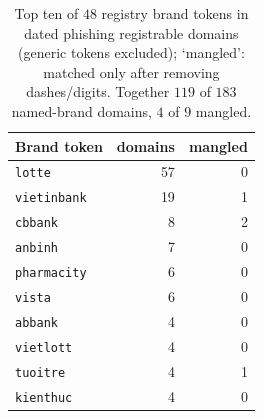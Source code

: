 \begin{table}[t]\centering
\caption{Top ten of $48$ registry brand tokens in dated phishing registrable domains (generic tokens excluded); `mangled': matched only after removing dashes/digits. Together $119$ of $183$ named-brand domains, $4$ of $9$ mangled.}
\label{tab:brands}
\begin{tabular}{lrr}\toprule
Brand token & domains & mangled \\ \midrule
\texttt{lotte} & 57 & 0 \\
\texttt{vietinbank} & 19 & 1 \\
\texttt{cbbank} & 8 & 2 \\
\texttt{anbinh} & 7 & 0 \\
\texttt{pharmacity} & 6 & 0 \\
\texttt{vista} & 6 & 0 \\
\texttt{abbank} & 4 & 0 \\
\texttt{vietlott} & 4 & 0 \\
\texttt{tuoitre} & 4 & 1 \\
\texttt{kienthuc} & 4 & 0 \\
\bottomrule\end{tabular}\end{table}
